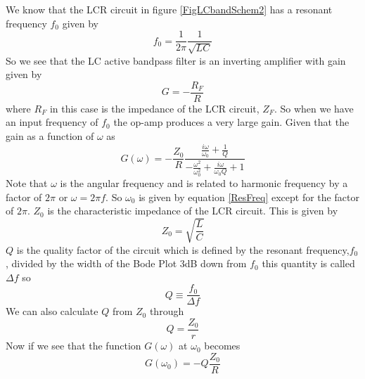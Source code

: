 \documentclass[11pt]{article}
\numberwithin{equation}{section}
\numberwithin{figure}{section}
\numberwithin{table}{section}
\begin{document}
We know that the LCR circuit in figure \ref{FigLCbandSchem2} has a resonant frequency $f_0$ given by
\begin{equation}
f_0 = \frac{1}{2\pi}\frac{1}{\sqrt{LC}}
\label{ResFreq}
\end{equation}
So we see that the LC active bandpass filter is an inverting amplifier with gain given by
\begin{equation}
G = -\frac{R_F}{R}
\label{InvGain}
\end{equation}
where $R_F$ in this case is the impedance of the LCR circuit, $Z_F$. So when we have an input frequency of $f_0$ the op-amp produces a very large gain. Given that the gain as a function of $\omega$ as
$$G(\omega) = -\frac{Z_0}{R}\frac{\frac{i\omega}{\omega_0}+\frac{1}{Q}}{-\frac{\omega^2}{\omega_0^2}+\frac{i\omega}{\omega_0Q}+1}$$
Note that $\omega$ is the angular frequency and is related to harmonic frequency by a factor of $2\pi$ or $\omega = 2\pi f$. So $\omega_0$ is given by equation \ref{ResFreq} except for the factor of $2\pi$. $Z_0$ is the characteristic impedance of the LCR circuit. This is given by
\begin{equation}
Z_0 = \sqrt{\frac{L}{C}}
\label{CharImp}
\end{equation}
$Q$ is the quality factor of the circuit which is defined by the resonant frequency,$f_0$, divided by the width of the Bode Plot $3$dB down from $f_0$ this quantity is called $\Delta f$ so
\begin{equation}
Q \equiv \frac{f_0}{\Delta f}
\label{QualDef}
\end{equation}
We can also calculate $Q$ from $Z_0$ through
\begin{equation}
Q = \frac{Z_0}{r}
\label{QualCalc}
\end{equation}
Now if we see that the function $G(\omega)$ at $\omega_0$ becomes
\begin{equation}
G(\omega_0) = -Q\frac{Z_0}{R}
\label{GainPeak}
\end{equation}
\end{document}
